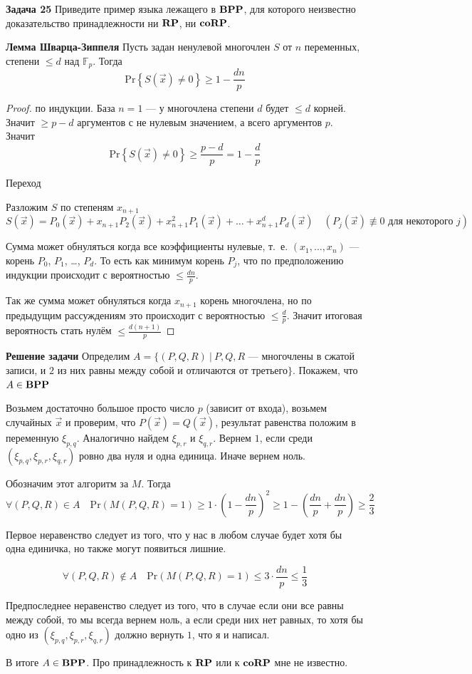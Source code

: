 \textbf{Задача 25} Приведите пример языка лежащего в $\textbf{BPP}$, для которого неизвестно доказательство принадлежности ни $\textbf{RP}$, ни $\textbf{coRP}$.

\textbf{Лемма Шварца-Зиппеля}
Пусть задан ненулевой многочлен $S$ от $n$ переменных, степени $\le d$ над $\mathds{F}_p$. Тогда
\[\mathrm{Pr}\left\{S(\vec x)\neq0\right\}\ge 1 - \frac{dn}{p}\]
\begin{proof} по индукции. База $n=1$ --- у многочлена степени $d$ будет $\le d$ корней. Значит $\ge p - d$ аргументов с не нулевым значением, а всего аргументов $p$.
Значит
\[\mathrm{Pr}\left\{S(\vec x)\neq0\right\}\ge\frac{p-d}{p}= 1 - \frac{d}{p}\]

Переход

Разложим $S$ по степеням $x_{n+1}$
\[S(\vec x) = P_0(\vec x) + x_{n + 1}P_2(\vec x) + x_{n + 1}^2 P_1(\vec x) + \ldots + x_{n+1}^d P_d(\vec x)\quad (P_j(\vec x)\not \equiv 0 \text{ для некоторого } j)\]

Сумма может обнуляться когда все коэффициенты нулевые, т.~е. $(x_1,\ldots,x_n)$ --- корень $P_0$, $P_1$, \ldots, $P_d$. То есть как минимум корень $P_j$, что по предположению индукции происходит с вероятностью $\le\frac{dn}{p}$.

Так же сумма может обнуляться когда $x_{n+1}$ корень многочлена, но по предыдущим рассуждениям это происходит с вероятностью $\le\frac{d}{p}$. Значит итоговая вероятность стать нулём $\le\frac{d(n+1)}{p}$ \end{proof}

\textbf{Решение задачи}
Определим $A=\{(P,Q,R)\ |\ P,Q,R$ --- многочлены в сжатой записи, и $2$ из них равны между собой и отличаются от третьего$\}$.
Покажем, что $A\in\textbf{BPP}$

Возьмем достаточно большое просто число $p$ (зависит от входа), возьмем случайных $\vec x$ и проверим, что $P(\vec x)=Q(\vec x)$, результат равенства положим в переменную $\xi_{p,q}$. Аналогично найдем $\xi_{p,r}$ и $\xi_{q,r}$. Вернем $1$, если среди $(\xi_{p,q},\xi_{p,r},\xi_{q,r})$ ровно два нуля и одна единица. Иначе вернем ноль. 

Обозначим этот алгоритм за $M$. Тогда
\[\forall (P,Q,R)\in A\quad \mathrm{Pr}(M(P,Q,R) = 1)\ge 1 \cdot \left(1 - \frac{dn}{p}\right)^2 \ge 1 - \left(\frac{dn}{p}+\frac{dn}{p}\right) \ge \frac{2}{3}\]

Первое неравенство следует из того, что у нас в любом случае будет хотя бы одна единичка, но также могут появиться лишние.


\[\forall (P,Q,R)\not\in A\quad \mathrm{Pr}(M(P,Q,R) = 1)\le 3 \cdot \frac{dn}{p} \le \frac{1}{3}\]

Предпоследнее неравенство следует из того, что в случае если они все равны между собой, то мы всегда вернем ноль, а если среди них нет равных, то хотя бы одно из $(\xi_{p,q},\xi_{p,r},\xi_{q,r})$ должно вернуть $1$, что я и написал.

В итоге $A\in \textbf{BPP}$. Про принадлежность к $\textbf{RP}$ или к $\textbf{coRP}$ мне не известно.
